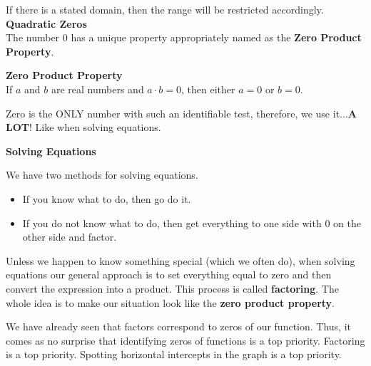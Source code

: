\documentclass{ximera}
\begin{document}
If there is a stated domain, then the range will be restricted accordingly. \\





\textbf{\textcolor{blue!75!black}{Quadratic Zeros}} \\

The number $0$ has a unique property appropriately named as the \textbf{Zero Product Property}.  



\begin{definition}  \textbf{\textcolor{green!50!black}{Zero Product Property}} \\

If $a$ and $b$ are real numbers and $a\cdot b = 0$, then either $a=0$ or $b=0$.

\end{definition}


Zero is the ONLY number with such an identifiable test, therefore, we use it...\textbf{\textcolor{purple!85!blue}{A LOT}}!   Like when solving equations. \\


\begin{procedure}  \textbf{\textcolor{blue!55!black}{Solving Equations}}

We have two methods for solving equations.

\begin{itemize}
     \item If you know what to do, then go do it. \\
     \item If you do not know what to do, then get everything to one side with $0$ on the other side and factor.
\end{itemize}


Unless we happen to know something special (which we often do), when solving equations our general approach is to set everything equal to zero and then convert the expression into a product.  This process is called \textbf{factoring}.  The whole idea is to make our situation look like the \textbf{zero product property}.

\end{procedure}






We have already seen that factors correspond to zeros of our function. Thus, it comes as no surprise that identifying zeros of functions is a top priority.  Factoring is a top priority. Spotting horizontal intercepts in the graph is a top priority.
\end{document}
